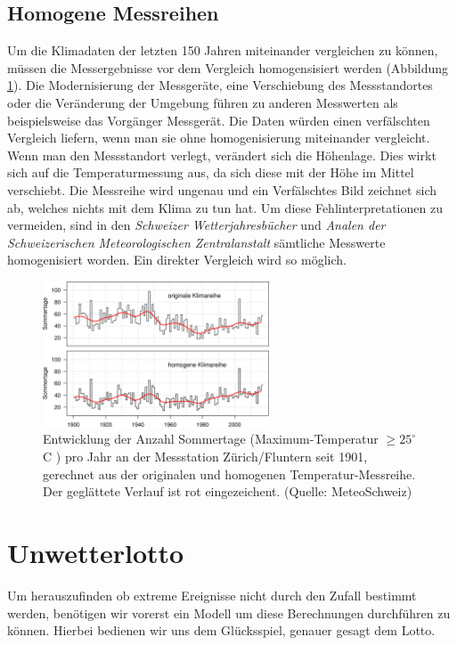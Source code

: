 \begin{refsection}
\subsection{Homogene Messreihen}
Um die Klimadaten der letzten 150 Jahren miteinander vergleichen zu können, müssen die Messergebnisse vor dem Vergleich homogensisiert werden (Abbildung \ref{Homogen}). Die Modernisierung der Messgeräte,  eine Verschiebung des Messstandortes oder die Veränderung der Umgebung führen zu anderen Messwerten als beispielsweise das Vorgänger Messgerät. Die Daten würden einen verfälschten Vergleich liefern, wenn man sie ohne homogenisierung miteinander vergleicht.
Wenn man den Messstandort verlegt, verändert sich die Höhenlage. Dies wirkt sich auf die Temperaturmessung aus, da sich diese mit der Höhe im Mittel verschiebt. Die Messreihe wird ungenau und ein Verfälschtes Bild zeichnet sich ab, welches nichts mit dem Klima zu tun hat.
Um diese Fehlinterpretationen zu vermeiden, sind in den \textit{Schweizer Wetterjahresbücher} und \textit{Analen der Schweizerischen Meteorologischen Zentralanstalt} sämtliche Messwerte homogenisiert worden. Ein direkter Vergleich wird so möglich.

\begin{figure}[htbp]
\centering
\includegraphics[width=0.6\textwidth]{extrem/Homogen.jpg}
\caption{Entwicklung der Anzahl Sommertage (Maximum-Temperatur $\ge 25^{\circ}$C ) pro Jahr an der Messstation Zürich/Fluntern seit 1901, gerechnet aus der originalen und homogenen Temperatur-Messreihe. Der geglättete Verlauf ist rot eingezeichent. (Quelle: MeteoSchweiz)}
\label{Homogen}
\end{figure}


\section{Unwetterlotto}
Um herauszufinden ob extreme Ereignisse nicht durch den Zufall bestimmt werden, benötigen wir vorerst ein Modell um diese Berechnungen durchführen zu können.
Hierbei bedienen wir uns dem Glücksspiel, genauer gesagt dem Lotto.


\end{refsection}
